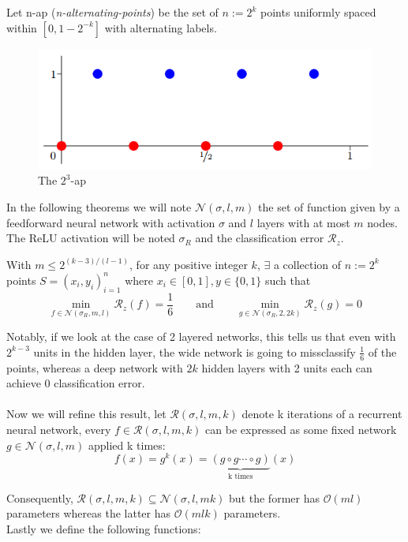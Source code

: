 \documentclass{article}
\begin{document}
Let n-ap (\textit{n-alternating-points}) be the set of $n := 2^k$ points  uniformly spaced within $[0, 1-2^{-k}]$ with alternating labels.
\begin{figure}[H]
    \centering
    \includegraphics[width=.6\textwidth]{figures/nap.png}
    \caption{The $2^3$-ap \cite{telgarsky2015representation}}
\end{figure}

In the following theorems we will note $\mathscr{N}(\sigma, l, m)$ the set of function given by a feedforward neural network with activation $\sigma$ and $l$ layers with at most $m$ nodes. The ReLU activation will be noted $\sigma_R$ and the classification error $\mathcal{R}_z$.

\begin{thm}
With $m \leq 2^{(k-3)/(l-1)}$, for any positive integer $k$, $\exists$ a collection of $n:=2^k$ points $S = (x_i,y_i)^n_{i=1}$ where $x_i \in [0, 1], y \in \{0, 1\}$ such that \\
$$\min_{f\in\mathscr{N}(\sigma_R, m, l)} \mathcal{R}_z(f) = \frac{1}{6} \quad \quad \text{and} \quad \quad \min_{g\in\mathscr{N}(\sigma_R, 2, 2k)} \mathcal{R}_z(g) = 0$$
\end{thm}

Notably, if we look at the case of 2 layered networks, this tells us that even with $2^{k-3}$ units in the hidden layer, the wide network is going to missclassify $\frac{1}{6}$ of the points, whereas a deep network with $2k$ hidden layers with 2 units each can achieve 0 classification error. \\\\

Now we will refine this result, let $\mathscr{R}(\sigma, l, m, k)$ denote k iterations of a recurrent neural network, every $f \in \mathscr{R}(\sigma, l, m, k)$ can be expressed as some fixed network $g \in \mathscr{N}(\sigma, l, m)$ applied k times:
$$f(x) = g^k(x) = \underbrace{(g\circ g \cdots \circ g)}_\text{k times}(x)$$

Consequently, $\mathscr{R}(\sigma, l, m, k) \subseteq \mathscr{N}(\sigma, l, mk)$ but the former has $\mathcal{O}(ml)$ parameters whereas the latter has $\mathcal{O}(mlk)$ parameters. \\
Lastly we define the following functions:
\end{document}
